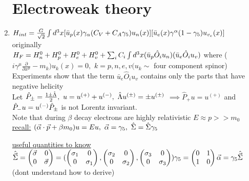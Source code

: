 \documentclass[12pt]{amsart}
\begin{document}
\begin{enumerate}
\section*{Electroweak theory}
\item \underline{$H_{int} = \frac{G}{\sqrt{2}} \int d^3 x [ \bar{u}_p(x) \gamma_{\alpha} (C_V + C_A \gamma_5) u_n(x)][\bar{u}_e(x) \gamma^{\alpha} (1-\gamma_5)u_{v_e}(x)]\\$}\\
originally\\
$H_F= H_n^0 + H_p^0 + H_e^0 + H_v^0 + \sum_i C_i \int d^3 x(\bar{u}_p \hat{O}_i u_n)(\bar{u}_e \hat{O}_i u_v)\\$
where ($i \gamma^{\mu} \frac{\partial}{\partial x^{\mu}} - m_k)u_k(x) = 0,\,\, k=p,n,e,v (u_k \sim$ four component spinor)\\
Experiments show that the term $\bar{u}_e \hat{O}_i u_v$ contains only the parts that have negative helicity\\
Let $\hat{P}_{\pm} = \frac{1 \pm \hat{\Lambda}}{2},\,\, u = u^{(+)} + u^{(-)},\,\, \hat{\Lambda} u^{(\pm)} = \pm u^{(\pm)}\\$
$\implies \hat{P}_+ u = u^{(+)}$ and $\hat{P}_- u = u^{(-)}\\
\hat{P}_{\pm}$ is not Lorentz invariant.\\
Note that during $\beta$ decay electrons are highly relativistic $E \approx p >> m_0$\\
\underline{recall:} $(\vec{\alpha} \cdot \vec{p} + \beta m_0) u = Eu,\,\, \vec{\alpha} = \gamma_5,\,\, \hat{\Sigma} = \hat{\Sigma} \gamma_5\\$


\hdashrule[0.5ex][c]{\linewidth}{0.5pt}{1.5mm}

\underline{useful quantities to know}\\
$\hat{\vec{\Sigma}} = \begin{pmatrix} \vec{\sigma} & 0 \\ 0 & \vec{\sigma} \end{pmatrix} = (\begin{pmatrix} \sigma_1 & 0 \\ 0 & \sigma_1 \end{pmatrix},\begin{pmatrix} \sigma_2 & 0 \\ 0 & \sigma_2 \end{pmatrix},\begin{pmatrix} \sigma_3 & 0 \\ 0 & \sigma_3 \end{pmatrix})\\
\gamma_5 = \begin{pmatrix} 0 & 1 \\ 1 & 0 \end{pmatrix}\\
\vec{\alpha} = \gamma_5 \hat{\vec{\Sigma}}\\$ (dont understand how to derive)



\end{enumerate}
\end{document}
